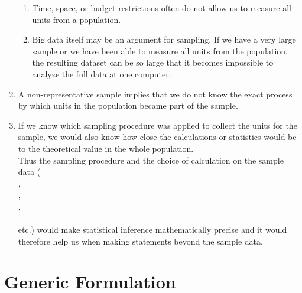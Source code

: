 \begin{enumerate}
\begin{enumerate}
        \item Time, space, or budget restrictions often do not allow us to measure all units from a population.
        \hfill \cite{statistics/book/Statistics-for-Data-Scientists/Maurits-Kaptein}

        \item  Big data itself may be an argument for sampling. If we have a very large sample or we have been able to measure all units from the population, the resulting dataset can be so large that it becomes impossible to analyze the full data at one computer.
        \hfill \cite{statistics/book/Statistics-for-Data-Scientists/Maurits-Kaptein}
    \end{enumerate}

    \item A non-representative sample implies that we do not know the exact process by which units in the population became part of the sample.
    \hfill \cite{statistics/book/Statistics-for-Data-Scientists/Maurits-Kaptein}

    \item If we know which sampling procedure was applied to collect the units for the sample, we would also know how close the calculations or statistics would be to the theoretical value in the whole population.
    \hfill \cite{statistics/book/Statistics-for-Data-Scientists/Maurits-Kaptein}
    \\
    Thus the sampling procedure and the choice of calculation on the sample data (\\
    , \\
    ,\\
    , \\
    \\
    etc.) would make statistical inference mathematically precise and it would therefore help us when making statements beyond the sample data.
    \hfill \cite{statistics/book/Statistics-for-Data-Scientists/Maurits-Kaptein}


\end{enumerate}

\section{Generic Formulation \cite{statistics/book/Statistics-for-Data-Scientists/Maurits-Kaptein}}

